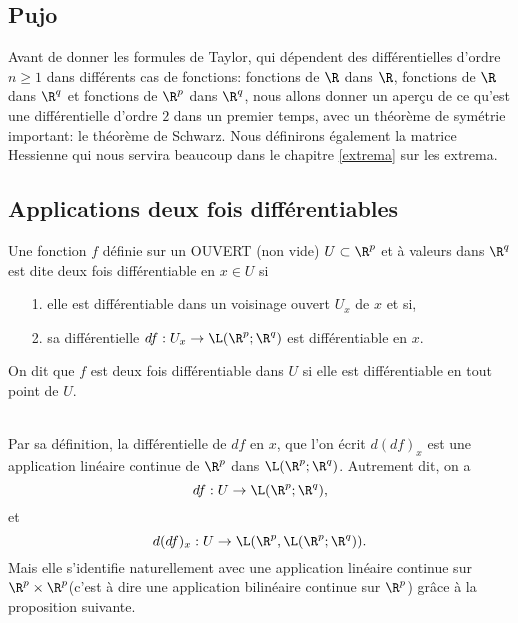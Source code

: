 \documentclass[12pt, class=report,crop=false]{standalone}
\begin{document}
\subsection{Pujo}

Avant de donner les formules de Taylor, qui dépendent des différentielles d'ordre $n \geq 1$ dans différents cas de fonctions: fonctions de $\R$ dans $\R$, fonctions de $\R$ dans $\R^q$ et
fonctions de $\R^p$ dans $\R^q$, nous allons donner un aperçu de ce qu'est une différentielle d'ordre $2$ dans un premier temps, avec un 
théorème de symétrie important: le théorème de Schwarz. Nous définirons également la matrice Hessienne qui nous servira beaucoup
dans le chapitre \ref{extrema}  sur les extrema. 
\subsection{Applications deux fois différentiables}

\begin{definition}
\textcolor[rgb]{0.73,0.00,0.00}{
Une fonction $f$ d\'efinie sur un OUVERT (non vide) $U \subset \R^p$  et \`a valeurs dans
$\R^q$ est dite deux fois diff\'erentiable en $x \in U$ si
\begin{itemize}
  \item[1.] elle est diff\'erentiable dans un voisinage ouvert $U_x$ de $x$ et si,
  \item[2.] sa diff\'erentielle $df: U_x \rightarrow \L(\R^p;\R^q)$ est diff\'erentiable en $x$.
\end{itemize}
 On dit que $f$ est deux fois diff\'erentiable dans $U$ si elle est diff\'erentiable en tout point de $U$.
}
 \end{definition}


  \begin{remarque*}
\textcolor[rgb]{0.00,0.00,1.00}{ \\
Par sa d\'efinition, la diff\'erentielle de $df$ en $x$, que l'on \'ecrit $d(df)_x$ est une application
lin\'eaire continue de $\R^p$ dans $\L(\R^p;\R^q)$. Autrement dit, on a
\begin{equation*}
  df:U \rightarrow \L(\R^p;\R^q),
\end{equation*}
et
\begin{equation*}
  d(df)_x: U\rightarrow \L(\R^p,\L(\R^p;\R^q)).
\end{equation*}
 Mais elle s'identifie naturellement avec une application lin\'eaire
continue sur $\R^p \times \R^p$(c'est à dire une application bilinéaire continue sur
$\R^p$)  gr\^ace \`a la proposition suivante.
}
\end{remarque*}
\end{document}
